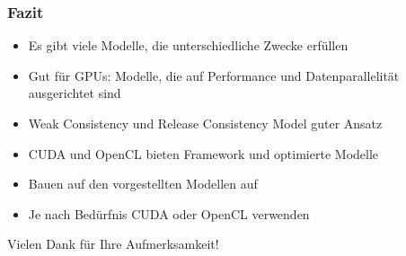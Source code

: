 \documentclass{sikslides}
\begin{document}
\begin{frame}
	\frametitle{Fazit}
\begin{itemize}

		\item Es gibt viele Modelle, die unterschiedliche Zwecke erfüllen \bigskip
		\item Gut für GPUs: Modelle, die auf Performance und Datenparallelität ausgerichtet sind \bigskip
		\item Weak Consistency und Release Consistency Model guter Ansatz\bigskip
		\item CUDA und OpenCL bieten Framework und optimierte Modelle  \bigskip
		\item Bauen auf den vorgestellten Modellen auf \bigskip
		\item Je nach Bedürfnis CUDA oder OpenCL verwenden


	\end{itemize}
\end{frame}

\begin{frame}
	
Vielen Dank für Ihre Aufmerksamkeit!
\end{frame}
\end{document}
